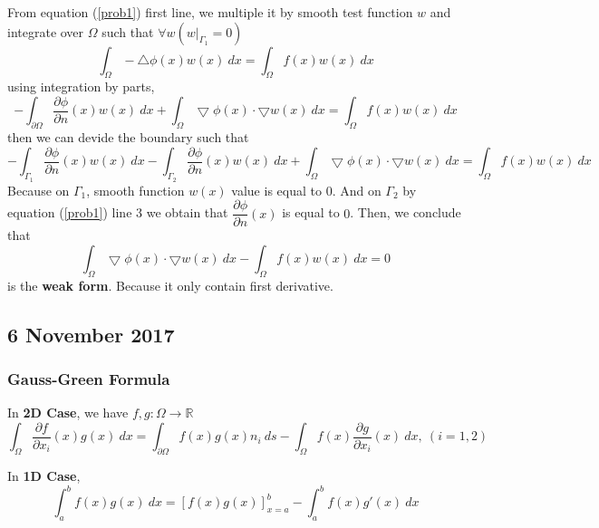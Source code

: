 \documentclass[a4paper,10pt]{article}
\begin{document}
From equation (\ref{prob1}) first line, we multiple it by smooth test function $ w $ and integrate over $ \Omega $ such that  $ \forall w (w|_{\Gamma_{1}}=0 ) $
\begin{equation*}\nonumber
\int_{\Omega} -\bigtriangleup \phi(x) w(x) \ dx = \int_{\Omega} f(x) w(x) \ dx
\end{equation*}
using integration by parts,
\begin{equation*}
-\int_{\partial\Omega} \dfrac{\partial \phi}{\partial n} (x) w(x) \ dx + \int_{\Omega} \bigtriangledown \phi(x) \cdot \bigtriangledown w(x) \ dx = \int_{\Omega} f(x) w(x) \ dx
 \end{equation*} 
 then we can devide the boundary such that
 \begin{equation*}
 -\int_{\Gamma_{1}} \dfrac{\partial \phi}{\partial n} (x) w(x) \ dx - \int_{\Gamma_{2}} \dfrac{\partial \phi}{\partial n} (x) w(x) \ dx + \int_{\Omega} \bigtriangledown \phi(x) \cdot \bigtriangledown w(x) \ dx = \int_{\Omega} f(x) w(x) \ dx
 \end{equation*} 
 Because on $ \Gamma_{1} $, smooth function $ w(x) $ value is equal to $ 0 $. And on $ \Gamma_{2} $ by equation (\ref{prob1}) line 3 we obtain that $ \dfrac{\partial \phi}{\partial n} (x) $ is equal to $ 0 $. Then, we conclude that
 \begin{equation}\label{prob1_weak}
 \int_{\Omega} \bigtriangledown \phi (x) \cdot \bigtriangledown w(x) \ dx - \int_{\Omega} f(x) w(x) \ dx =0
 \end{equation}
 is the \textbf{weak form}. Because it only contain first derivative.

\subsection{6 November 2017}

\subsubsection{Gauss-Green Formula}
In \textbf{2D Case}, we have $ f,g : \Omega \rightarrow \mathbb{R} $
\begin{equation}\label{GG2D}
\int_{\Omega} \dfrac{\partial f}{\partial x_{i}} (x) g(x) \ dx = \int_{\partial \Omega} f(x) g(x) n_{i} \ ds - \int_{\Omega} f(x) \dfrac{\partial g}{\partial x_{i}} (x) \ dx, \ (i=1,2)
\end{equation}

In \textbf{1D Case},
\begin{equation}\label{GG1D}
\int_{a}^{b} f(x) g(x) \ dx = [ f(x) g(x) ]_{x=a}^{b} - \int_{a}^{b} f(x) g'(x) \ dx
\end{equation}
\end{document}
